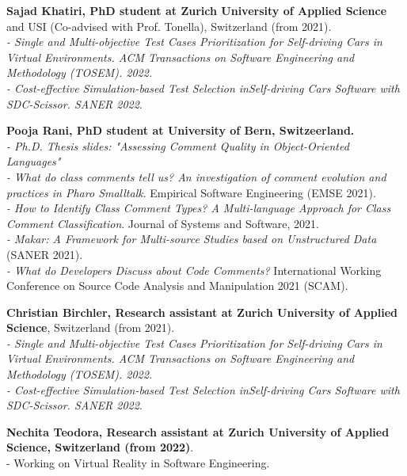 \documentclass[10pt]{article}
\begin{document}
\begin{bibsection}

\item \textbf{Sajad Khatiri, PhD student at Zurich University of Applied Science} and USI (Co-advised with Prof. Tonella), Switzerland (from 2021).\\
\textit{- Single and Multi-objective Test Cases Prioritization for Self-driving Cars in Virtual Environments. ACM Transactions on Software Engineering and Methodology (TOSEM). 2022.}\\
\textit{- Cost-effective Simulation-based Test Selection inSelf-driving Cars Software with SDC-Scissor.  SANER 2022}.   

\item \textbf{Pooja Rani, PhD student at University of Bern, Switzeerland. }\\
 \textit{- Ph.D. Thesis slides: "Assessing Comment Quality in Object-Oriented Languages"}\\
       \textit{- What do class comments tell us? An investigation of comment evolution and practices in Pharo Smalltalk}. Empirical Software Engineering (EMSE 2021).\\
       \textit{- How to Identify Class Comment Types? A Multi-language Approach for Class Comment Classification}. Journal of Systems and Software, 2021. \\
       \textit{- Makar: A Framework for Multi-source Studies based on Unstructured Data}  (SANER 2021).\\
       \textit{- What do Developers Discuss about Code Comments?} International Working Conference on Source Code Analysis and Manipulation 2021 (SCAM).\\

\item \textbf{Christian Birchler, Research assistant at Zurich University of Applied Science}, Switzerland (from 2021). \\
\textit{- Single and Multi-objective Test Cases Prioritization for Self-driving Cars in Virtual Environments. ACM Transactions on Software Engineering and Methodology (TOSEM). 2022.}\\
\textit{- Cost-effective Simulation-based Test Selection inSelf-driving Cars Software with SDC-Scissor.  SANER 2022}. 

\item \textbf{Nechita Teodora, Research assistant at Zurich University of Applied Science, Switzerland (from 2022)}. \\
- Working on Virtual Reality in Software Engineering.\\ 


\end{bibsection}
\end{document}
